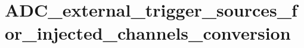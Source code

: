 \hypertarget{group___a_d_c__external__trigger__sources__for__injected__channels__conversion}{\section{A\-D\-C\-\_\-external\-\_\-trigger\-\_\-sources\-\_\-for\-\_\-injected\-\_\-channels\-\_\-conversion}
\label{group___a_d_c__external__trigger__sources__for__injected__channels__conversion}
}
